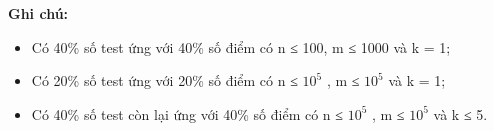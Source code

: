 \textbf{Ghi chú: }
\begin{itemize}
	\item Có 40\% số test ứng với 40\% số điểm có n ≤ 100, m ≤ 1000 và k = 1;
	\item Có 20\% số test ứng với 20\% số điểm có n ≤ $10^{5}$ , m ≤ $10^{5}$ và k = 1;
	\item Có 40\% số test còn lại ứng với 40\% số điểm có n ≤ $10^{5}$ , m ≤ $10^{5}$ và k ≤ 5.
\end{itemize}
